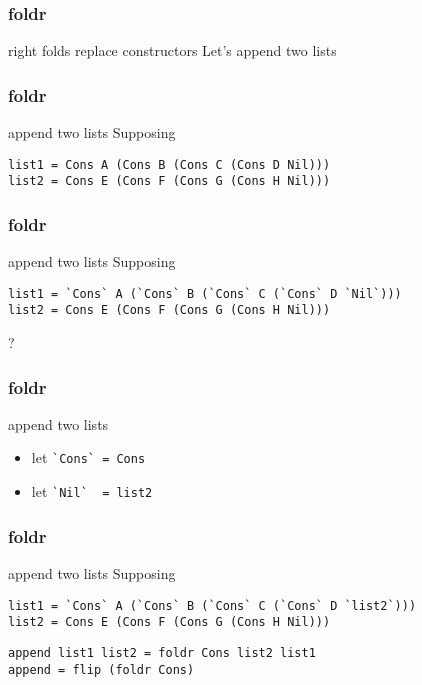%

\begin{frame}[fragile]
\frametitle{foldr}
\begin{block}{right folds replace constructors}
Let's append two lists
\end{block}
\end{frame}

\begin{frame}[fragile]
\frametitle{foldr}
\begin{block}{append two lists}
Supposing 
\begin{lstlisting}[style=haskell,basicstyle=\tiny\ttfamily,mathescape]
list1 = Cons A (Cons B (Cons C (Cons D Nil)))
list2 = Cons E (Cons F (Cons G (Cons H Nil)))
\end{lstlisting}
\end{block}
\end{frame}

\begin{frame}[fragile]
\frametitle{foldr}
\begin{block}{append two lists}
Supposing 
\begin{lstlisting}[style=haskell,basicstyle=\tiny\ttfamily,mathescape]
list1 = `Cons` A (`Cons` B (`Cons` C (`Cons` D `Nil`)))
list2 = Cons E (Cons F (Cons G (Cons H Nil)))
\end{lstlisting}
\end{block}
\begin{center}
\LARGE
?
\end{center}
\end{frame}

\begin{frame}[fragile]
\frametitle{foldr}
\begin{block}{append two lists}
\begin{itemize}
\item let \lstinline{`Cons` = Cons}
\item let \lstinline{`Nil`  = list2}
\end{itemize}
\end{block}
\end{frame}

\begin{frame}[fragile]
\frametitle{foldr}
\begin{block}{append two lists}
Supposing
\begin{lstlisting}[style=haskell,basicstyle=\tiny\ttfamily,mathescape]
list1 = `Cons` A (`Cons` B (`Cons` C (`Cons` D `list2`)))
list2 = Cons E (Cons F (Cons G (Cons H Nil)))
\end{lstlisting}
\end{block}
\begin{lstlisting}[style=haskell,basicstyle=\scriptsize\ttfamily,mathescape]
append list1 list2 = foldr Cons list2 list1
append = flip (foldr Cons)
\end{lstlisting}
\end{frame}

